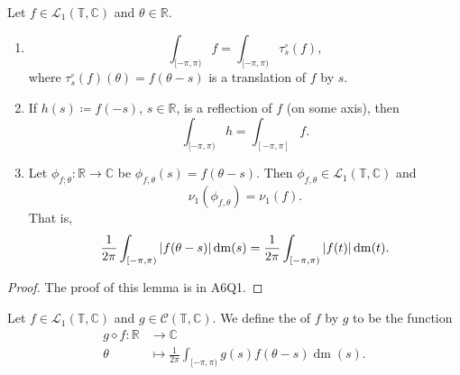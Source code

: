 \documentclass[notoc,notitlepage]{tufte-book}
\DeclareMathOperator{\dm}{dm}
\begin{document}
\begin{lemma}\label{lemma:preservation_of_the_lebesgue_integral_of_2pi_periodic_functions_under_certain_transformations}
  Let $f \in \mathcal{L}_1(\mathbb{T}, \mathbb{C})$ and $\theta \in \mathbb{R}$.
  \begin{enumerate}
    \item 
      \begin{equation*}
        \int_{[-\pi, \pi)} f = \int_{[-\pi, \pi)} \tau_s^\circ(f),
      \end{equation*}
      where $\tau_s^\circ(f)(\theta) = f(\theta - s)$ is a translation of $f$ by
      $s$.
    \item If $h(s) \coloneqq f(-s)$, $s \in \mathbb{R}$, is a
      reflection of $f$ (on some axis), then
      \begin{equation*}
        \int_{[-\pi, \pi)} h = \int_{[-\pi, \pi]} f.
      \end{equation*}
    \item Let $\phi_{f; \theta} : \mathbb{R} \to \mathbb{C}$ be
      $\phi_{f, \theta}(s) = f(\theta - s)$.
      Then $\phi_{f, \theta} \in \mathcal{L}_1(\mathbb{T}, \mathbb{C})$ and
      \begin{equation*}
        \nu_1(\phi_{f, \theta}) = \nu_1(f).
      \end{equation*}
      That is,
      \begin{equation*}
        \frac{1}{2\pi} \int_{[-\pi, \pi)} \abs{f(\theta - s)} \dm(s)
        = \frac{1}{2\pi} \int_{[-\pi, \pi)} \abs{f(t)} \dm(t).
      \end{equation*}
  \end{enumerate}
\end{lemma}

\begin{proof}
  The proof of this lemma is in A6Q1.
\end{proof}

\begin{defn}[Convolution]\label{defn:convolution}
  Let $f \in \mathcal{L}_1(\mathbb{T}, \mathbb{C})$ and
  $g \in \mathcal{C}(\mathbb{T}, \mathbb{C})$.
  We define the  of $f$ by $g$ to be the function
  \begin{align*}
    g \diamond f : \mathbb{R} &\to \mathbb{C} \\
       \theta &\mapsto \frac{1}{2\pi} \int_{[-\pi, \pi)} g(s)f(\theta - s) \dm(s).
  \end{align*}
\end{defn}
\end{document}
